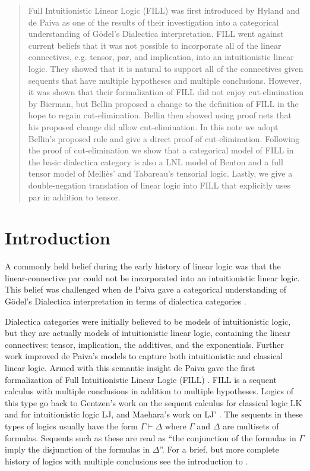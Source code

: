 \begin{abstract}
    Full Intuitionistic Linear Logic (FILL) was first introduced by
    Hyland and de Paiva as one of the results of their investigation
    into a categorical understanding of G\"odel’s Dialectica
    interpretation. FILL went against current beliefs that it was not
    possible to incorporate all of the linear connectives,
    e.g. tensor, par, and implication, into an intuitionistic linear
    logic. They showed that it is natural to support all of the
    connectives given sequents that have multiple hypotheses and
    multiple conclusions. However, it was shown that their
    formalization of FILL did not enjoy cut-elimination by Bierman,
    but Bellin proposed a change to the definition of FILL in the hope
    to regain cut-elimination.  Bellin then showed using proof nets
    that his proposed change did allow cut-elimination.  In this note
    we adopt Bellin's proposed rule and give a direct proof of
    cut-elimination.  Following the proof of cut-elimination we show
    that a categorical model of FILL in the basic dialectica category
    is also a LNL model of Benton and a full tensor model of
    Melli\`es' and Tabareau's tensorial logic.  Lastly, we give a
    double-negation translation of linear logic into FILL that
    explicitly uses par in addition to tensor.
\end{abstract}

\section{Introduction}
\label{sec:introduction}

A commonly held belief during the early history of linear logic was
that the linear-connective par could not be incorporated into an
intuitionistic linear logic.  This belief was challenged when de Paiva
gave a categorical understanding of G\"odel's Dialectica
interpretation in terms of dialectica categories
\cite{dePaiva:1987,dePaiva:1988}.  

Dialectica categories were initially believed to be models of
intuitionistic logic, but they are actually models of intuitionistic
linear logic, containing the linear connectives: tensor, implication,
the additives, and the exponentials.  Further work improved de Paiva's
models to capture both intuitionistic and classical linear logic.
Armed with this semantic insight de Paiva gave the first formalization
of Full Intuitionistic Linear Logic (FILL) \cite{dePaiva:1988}.  FILL
is a sequent calculus with multiple conclusions in addition to
multiple hypotheses.  Logics of this type go back to Gentzen's work on
the sequent calculus for classical logic LK and for intuitionistic
logic LJ, and Maehara's work on LJ' \cite{Maehara:1954,Takeuti:1975}.
The sequents in these types of logics usually have the form $\Gamma
\vdash \Delta$ where $\Gamma$ and $\Delta$ are multisets of formulas.
Sequents such as these are read as ``the conjunction of the formulas
in $\Gamma$ imply the disjunction of the formulas in $\Delta$''.  For
a brief, but more complete history of logics with multiple conclusions
see the introduction to \cite{dePaiva:2005}.

